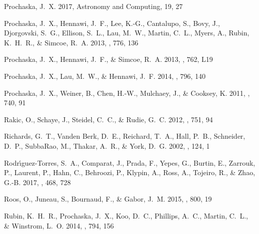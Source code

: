 \documentclass[iop]{emulateapj}
\begin{document}
\begin{thebibliography}{52}
{Prochaska}, J.~X. 2017, Astronomy and Computing, 19, 27

{Prochaska}, J.~X., {Hennawi}, J.~F., {Lee}, K.-G., {Cantalupo}, S., {Bovy},
  J., {Djorgovski}, S.~G., {Ellison}, S.~L., {Lau}, M.~W., {Martin}, C.~L.,
  {Myers}, A., {Rubin}, K.~H.~R., \& {Simcoe}, R.~A. 2013{}, \apj,
  776, 136

{Prochaska}, J.~X., {Hennawi}, J.~F., \& {Simcoe}, R.~A. 2013{},
  \apjl, 762, L19

{Prochaska}, J.~X., {Lau}, M.~W., \& {Hennawi}, J.~F. 2014, \apj, 796, 140

{Prochaska}, J.~X., {Weiner}, B., {Chen}, H.-W., {Mulchaey}, J., \& {Cooksey},
  K. 2011, \apj, 740, 91

{Rakic}, O., {Schaye}, J., {Steidel}, C.~C., \& {Rudie}, G.~C. 2012, \apj, 751,
  94

{Richards}, G.~T., {Vanden Berk}, D.~E., {Reichard}, T.~A., {Hall}, P.~B.,
  {Schneider}, D.~P., {SubbaRao}, M., {Thakar}, A.~R., \& {York}, D.~G. 2002,
  \aj, 124, 1

{Rodr{\'{\i}}guez-Torres}, S.~A., {Comparat}, J., {Prada}, F., {Yepes}, G.,
  {Burtin}, E., {Zarrouk}, P., {Laurent}, P., {Hahn}, C., {Behroozi}, P.,
  {Klypin}, A., {Ross}, A., {Tojeiro}, R., \& {Zhao}, G.-B. 2017, \mnras, 468,
  728

{Roos}, O., {Juneau}, S., {Bournaud}, F., \& {Gabor}, J.~M. 2015, \apj, 800, 19

{Rubin}, K.~H.~R., {Prochaska}, J.~X., {Koo}, D.~C., {Phillips}, A.~C.,
  {Martin}, C.~L., \& {Winstrom}, L.~O. 2014, \apj, 794, 156


\end{thebibliography}
\end{document}
